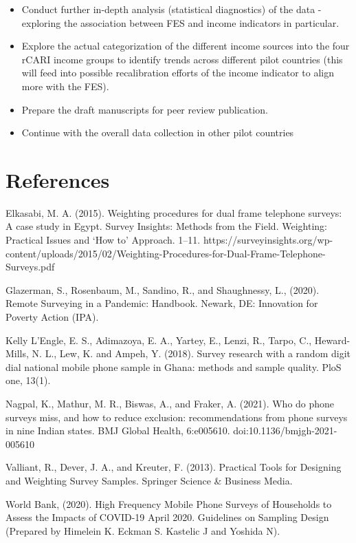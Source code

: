 \documentclass[11pt,harvard]{article}
\begin{document}
	\begin{itemize}[label=--, left=2.5em]
		\item[1.] Conduct further in-depth analysis (statistical diagnostics)  of the data - exploring the association between FES and income indicators in particular.
		\item[2.] Explore the actual categorization of the different income sources into the four rCARI income groups to identify trends across different pilot countries (this will feed into possible recalibration efforts of the income indicator to align more with the FES).
		\item[3.] Prepare the draft manuscripts for  peer review publication.	
		\item[4.] Continue with the overall data collection in other pilot countries
	\end{itemize} 
	
	
	\pagebreak
	
	
	\section{References}
	
	Elkasabi, M. A. (2015). Weighting procedures for dual frame telephone surveys: A case study in Egypt. Survey Insights: Methods from the Field. Weighting: Practical Issues and ‘How to’ Approach. 1–11. https://surveyinsights.org/wp-content/uploads/2015/02/Weighting-Procedures-for-Dual-Frame-Telephone-Surveys.pdf
	
	Glazerman, S., Rosenbaum, M., Sandino, R., and Shaughnessy, L., (2020). Remote Surveying in a Pandemic: Handbook. Newark, DE: Innovation for Poverty Action (IPA).
	
	Kelly L’Engle, E. S., Adimazoya, E. A., Yartey, E., Lenzi, R., Tarpo, C., Heward-Mills, N. L., Lew, K. and Ampeh, Y. (2018). Survey research with a random digit dial national mobile phone sample in Ghana: methods and sample quality. PloS one, 13(1).
	
	Nagpal, K., Mathur, M. R., Biswas, A., and Fraker, A. (2021). Who do phone surveys miss, and how to reduce exclusion: recommendations from phone surveys in nine Indian states. BMJ Global Health, 6:e005610. doi:10.1136/bmjgh-2021-005610
	
	Valliant, R., Dever, J. A., and Kreuter, F. (2013). Practical Tools for Designing and Weighting Survey Samples. Springer Science \& Business Media.
	
	World Bank, (2020). High Frequency Mobile Phone Surveys of Households to Assess the Impacts of COVID-19 April 2020. Guidelines on Sampling Design (Prepared by Himelein K. Eckman S. Kastelic J and Yoshida N).
	
\end{document}

